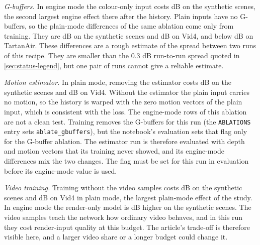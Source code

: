 \emph{G-buffers.} In engine mode the colour-only input costs  dB on the synthetic scenes, the second largest engine effect there after the history. Plain inputs have no G-buffers, so the plain-mode differences of the same ablation come only from training. They are  dB on the synthetic scenes and  dB on Vid4, and below  dB on TartanAir. \Observation{} These differences are a rough estimate of the spread between two runs of this recipe. They are smaller than the 0.3 dB run-to-run spread quoted in \cref{sec:status-legend}, but one pair of runs cannot give a reliable estimate.

\emph{Motion estimator.} In plain mode, removing the estimator costs  dB on the synthetic scenes and  dB on Vid4. Without the estimator the plain input carries no motion, so the history is warped with the zero motion vectors of the plain input, which is consistent with the loss. \Preliminary{} \UnderRevision{} The engine-mode rows of this ablation are not a clean test. Training removes the G-buffers for this run (the \texttt{ABLATIONS} entry sets \texttt{ablate\_gbuffers}), but the notebook's evaluation sets that flag only for the G-buffer ablation. The estimator run is therefore evaluated with depth and motion vectors that its training never showed, and its engine-mode differences mix the two changes. The flag must be set for this run in evaluation before its engine-mode value is used.

\emph{Video training.} Training without the video samples costs  dB on the synthetic scenes and  dB on Vid4 in plain mode, the largest plain-mode effect of the study. In engine mode the render-only model is  dB higher on the synthetic scenes. \Preliminary{} The video samples teach the network how ordinary video behaves, and in this run they cost render-input quality at this budget. The article's trade-off is therefore visible here, and a larger video share or a longer budget could change it.

